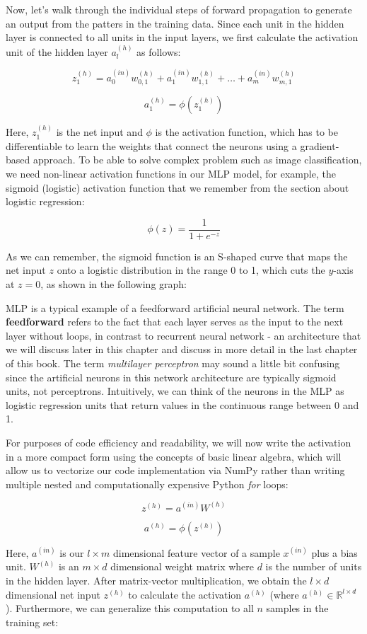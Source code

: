 \documentclass[11pt]{article}
\begin{document}
Now, let's walk through the individual steps of forward propagation to
generate an output from the patters in the training data. Since each
unit in the hidden layer is connected to all units in the input layers,
we first calculate the activation unit of the hidden layer \(a_l^{(h)}\)
as follows:

\[z_1^{(h)} = a_0^{(in)}w_{0,1}^{(h)} + a_1^{(in)}w_{1,1}^{(h)} + \ldots + a_m^{(in)}w_{m,1}^{(h)}\]

\[a_1^{(h)} = \phi(z_1^{(h)})\]

Here, \(z_1^{(h)}\) is the net input and \(\phi\) is the activation
function, which has to be differentiable to learn the weights that
connect the neurons using a gradient-based approach. To be able to solve
complex problem such as image classification, we need non-linear
activation functions in our MLP model, for example, the sigmoid
(logistic) activation function that we remember from the section about
logistic regression:

\[\phi(z) = \frac{1}{1 + e^{-z}}\]

As we can remember, the sigmoid function is an S-shaped curve that maps
the net input \(z\) onto a logistic distribution in the range 0 to 1,
which cuts the \(y\)-axis at \(z=0\), as shown in the following graph:

MLP is a typical example of a feedforward artificial neural network. The
term \textbf{feedforward} refers to the fact that each layer serves as
the input to the next layer without loops, in contrast to recurrent
neural network - an architecture that we will discuss later in this
chapter and discuss in more detail in the last chapter of this book. The
term \emph{multilayer perceptron} may sound a little bit confusing since
the artificial neurons in this network architecture are typically
sigmoid units, not perceptrons. Intuitively, we can think of the neurons
in the MLP as logistic regression units that return values in the
continuous range between 0 and 1.

For purposes of code efficiency and readability, we will now write the
activation in a more compact form using the concepts of basic linear
algebra, which will allow us to vectorize our code implementation via
NumPy rather than writing multiple nested and computationally expensive
Python \emph{for} loops:

\[z^{(h)} = a^{(in)}W^{(h)}\]

\[a^{(h)} = \phi(z^{(h)})\]

Here, \(a^{(in)}\) is our \(l \times m\) dimensional feature vector of a
sample \(x^{(in)}\) plus a bias unit. \(W^{(h)}\) is an \(m \times d\)
dimensional weight matrix where \(d\) is the number of units in the
hidden layer. After matrix-vector multiplication, we obtain the
\(l \times d\) dimensional net input \(z^{(h)}\) to calculate the
activation \(a^{(h)}\) (where \(a^{(h)} \in \mathbb{R}^{l \times d}\)).
Furthermore, we can generalize this computation to all \(n\) samples in
the training set:
\end{document}
